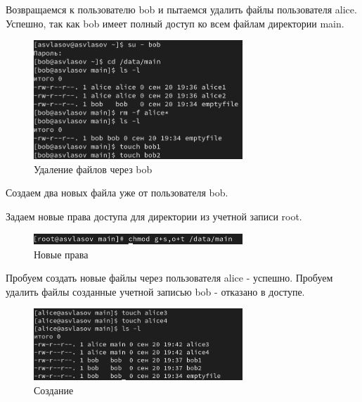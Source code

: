 \documentclass[
  12pt,
  a4paper,
  DIV=11,
  numbers=noendperiod]{scrreprt}
\begin{document}
Возвращаемся к пользователю bob и пытаемся удалить файлы пользователя
alice. Успешно, так как bob имеет полный доступ ко всем файлам
директории main.

\begin{figure}

{\centering \includegraphics[width=0.7\textwidth,height=\textheight]{image/4.png}

}

\caption{Удаление файлов через bob}

\end{figure}%

Создаем два новых файла уже от пользователя bob.

Задаем новые права доступа для директории из учетной записи root.

\begin{figure}

{\centering \includegraphics[width=0.7\textwidth,height=\textheight]{image/5.png}

}

\caption{Новые права}

\end{figure}%

Пробуем создать новые файлы через пользователя alice - успешно. Пробуем
удалить файлы созданные учетной записью bob - отказано в доступе.

\begin{figure}

{\centering \includegraphics[width=0.7\textwidth,height=\textheight]{image/6.png}

}

\caption{Создание}

\end{figure}%
\end{document}
